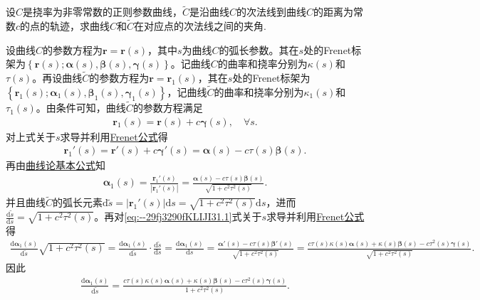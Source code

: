 \documentclass[../../main.tex]{subfiles}%
\begin{document}
\begin{example}
设$C$是挠率为非零常数的正则参数曲线，$\tilde{C}$是沿曲线$C$的次法线到曲线$C$的距离为常数$c$的点的轨迹，求曲线$C$和$\tilde{C}$在对应点的次法线之间的夹角.
\end{example}
\begin{solution}

设曲线$C$的参数方程为$\bm{r}=\bm{r}(s)$，其中$s$为曲线$C$的弧长参数。其在$s$处的Frenet标架为$\left\{ \bm{r}(s); \bm{\alpha}(s), \bm{\beta}(s), \bm{\gamma}(s) \right\}$。记曲线$C$的曲率和挠率分别为$\kappa(s)$和$\tau(s)$。再设曲线$\tilde{C}$的参数方程为$\bm{r}=\bm{r}_1(s)$，其在$s$处的Frenet标架为$\left\{ \bm{r}_1(s); \bm{\alpha}_1(s), \bm{\beta}_1(s), \bm{\gamma}_1(s) \right\}$，记曲线$\tilde{C}$的曲率和挠率分别为$\kappa_1(s)$和$\tau_1(s)$。由条件可知，曲线$\tilde{C}$的参数方程满足
\begin{align*}
\bm{r}_1(s) = \bm{r}(s) + c\bm{\gamma}(s),\quad \forall s.
\end{align*}
对上式关于$s$求导并利用\hyperref[theorem:微分几何-Frenet公式]{Frenet公式}得
\begin{align*}
\bm{r}_{1}'(s) = \bm{r}'(s) + c\bm{\gamma}'(s) = \bm{\alpha}(s) - c\tau(s)\bm{\beta}(s).
\end{align*}
再由\hyperref[theorem:曲线论基本公式]{曲线论基本公式}知
\begin{align}
\bm{\alpha}_1(s) = \frac{\bm{r}_{1}'(s)}{\left| \bm{r}_{1}'(s) \right|} = \frac{\bm{\alpha}(s) - c\tau(s)\bm{\beta}(s)}{\sqrt{1+c^2\tau^2(s)}}.
\label{eq:--29fj3290fKLIJI31.1}
\end{align}
并且曲线$\tilde{C}$的弧长元素$\mathrm{d}\tilde{s}=\left| \bm{r}_{1}'(s) \right|\mathrm{d}s=\sqrt{1+c^2\tau^2(s)}\mathrm{d}s$，进而$\frac{\mathrm{d}\tilde{s}}{\mathrm{d}s}=\sqrt{1+c^2\tau^2(s)}$。再对\eqref{eq:--29fj3290fKLIJI31.1}式关于$s$求导并利用\hyperref[theorem:微分几何-Frenet公式]{Frenet公式}得
\begin{align*}
\frac{\mathrm{d}\bm{\alpha}_1(s)}{\mathrm{d}\tilde{s}}\sqrt{1+c^2\tau^2(s)}=\frac{\mathrm{d}\bm{\alpha}_1(s)}{\mathrm{d}\tilde{s}}\cdot \frac{\mathrm{d}\tilde{s}}{\mathrm{d}s}=\frac{\mathrm{d}\bm{\alpha}_1(s)}{\mathrm{d}s}=\frac{\bm{\alpha}'(s) - c\tau(s)\bm{\beta}'(s)}{\sqrt{1+c^2\tau^2(s)}}=\frac{c\tau(s)\kappa(s)\bm{\alpha}(s) + \kappa(s)\bm{\beta}(s) - c\tau^2(s)\bm{\gamma}(s)}{\sqrt{1+c^2\tau^2(s)}}.
\end{align*}
因此
\begin{align*}
\frac{\mathrm{d}\bm{\alpha}_1(s)}{\mathrm{d}\tilde{s}}=\frac{c\tau(s)\kappa(s)\bm{\alpha}(s) + \kappa(s)\bm{\beta}(s) - c\tau^2(s)\bm{\gamma}(s)}{1+c^2\tau^2(s)}.

\end{align*}
\end{solution}
\end{document}

